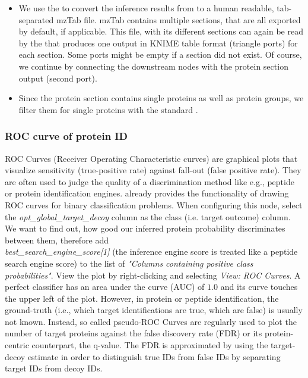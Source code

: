 \begin{itemize}
\item We use the  to convert the inference results from  to a human 
readable, tab-separated mzTab file. mzTab contains multiple sections, that are all exported by default, if 
applicable. This file, with its different sections can again be read by the  that produces one 
output in KNIME table format (triangle ports) for each section. Some ports might be empty if a section did not exist. 
Of course, we continue by connecting the downstream nodes with the protein section output (second port).
\item Since the protein section contains single proteins as well as protein groups, we filter them for single 
proteins with the standard . 
\end{itemize}

\subsubsection{ROC curve of protein ID}

ROC Curves (Receiver Operating Characteristic curves) are graphical plots that visualize sensitivity (true-positive 
rate) against fall-out (false positive rate). They are often used to judge the quality of a discrimination method 
like e.g., peptide or protein identification engines. 
 already provides the functionality of drawing ROC curves for binary classification problems. 
When configuring this node, select the \textit{opt\_global\_target\_decoy} column as the class (i.e. target outcome) 
column. We want to find out, how good our inferred protein probability discriminates between them, therefore add\\
\textit{best\_search\_engine\_score[1]} (the inference engine score is treated like a peptide search engine score) to 
the list of \textit{"Columns containing positive class probabilities"}. View the plot by right-clicking and selecting 
\textit{View: ROC Curves}. A perfect classifier has an area under the curve (AUC) of $1.0$ and its curve touches the upper 
left of the plot.
However, in protein or peptide identification, the ground-truth (i.e., which target identifications are true, which 
are false) is usually not known. Instead, so called pseudo-ROC Curves are regularly used to plot the number of target 
proteins against the false discovery rate (FDR) or its protein-centric counterpart, the q-value. 
The FDR is approximated by using the target-decoy estimate in order to distinguish
true IDs from false IDs by separating target IDs from decoy IDs.

